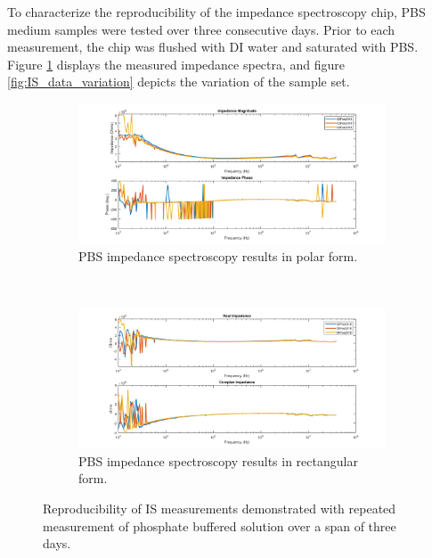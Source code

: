 \par To characterize the reproducibility of the impedance spectroscopy chip, PBS medium samples were tested over three consecutive days. Prior to each measurement, the chip was flushed with DI water and saturated with PBS. Figure \ref{fig:IS_data_reproducibility} displays the measured impedance spectra, and figure \ref{fig:IS_data_variation} depicts the variation of the sample set. 

\begin{figure}[h]
    \centering
    \begin{subfigure}[b]{\textwidth}
        \centering
        \includegraphics[width=\textwidth]{images/reproducibility_PBS_mag_phase.png}
        \caption{PBS impedance spectroscopy results in polar form.}
    \end{subfigure}
    \\
    \vspace{0.1 in}
    \begin{subfigure}[b]{\textwidth}
        \centering
        \includegraphics[width=\textwidth]{images/reproducibility_PBS_real_imag.png}
        \caption{PBS impedance spectroscopy results in rectangular form.}
    \end{subfigure}
    \caption[Reproducibility of IS measurements demonstrated with repeated measurement of phosphate buffered solution]{Reproducibility of IS measurements demonstrated with repeated measurement of phosphate buffered solution over a span of three days.}
    \label{fig:IS_data_reproducibility}
\end{figure}

